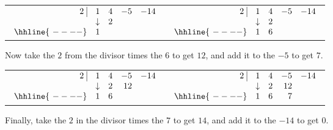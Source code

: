 \begin{center}
\begin{tabular}{cc}
$ \begin{array}{rrrrr}
  2 \, \, \vline& 1 & 4 & -5  & -14 \\
   & \downarrow  &  2  &    &  \\ \hhline{~----} 
  & 1  &     &   &    \\  
\end{array}$ \hspace{1in}
&
$ \begin{array}{rrrrr}
  2 \, \, \vline& 1 & 4 & -5  & -14 \\
   & \downarrow &  2  &    &  \\ \hhline{~----} 
  & 1  &   6  &   &    \\  
\end{array}$ \\
\end{tabular}
\end{center}

\bigskip

Now take the $2$ from the divisor times the $6$ to get $12$, and add it to the $-5$ to get $7$.

\bigskip

\begin{center}
\begin{tabular}{cc}
$ \begin{array}{rrrrr}
  2 \, \, \vline& 1 & 4 & -5  & -14 \\
   & \downarrow &  2  &  12  &  \\ \hhline{~----} 
  & 1  &   6  &   &    \\  
\end{array}$ \hspace{1in}
&
$ \begin{array}{rrrrr}
  2 \, \, \vline& 1 & 4 & -5  & -14 \\
   & \downarrow &  2  &  12  &  \\ \hhline{~----} 
  & 1  &   6  & 7  &    \\  
\end{array}$ \\
\end{tabular}

\end{center}


Finally, take the $2$ in the divisor times the $7$ to get $14$, and add it to the $-14$ to get $0$.

